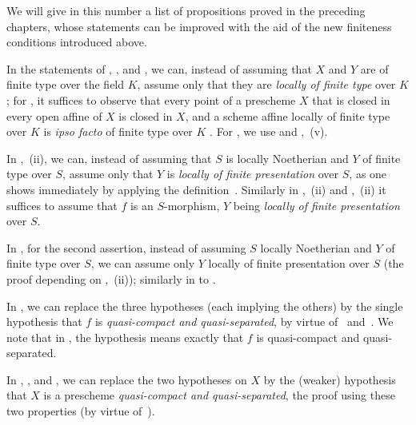 We will give in this number a list of propositions proved in the preceding chapters, whose statements can be improved with the aid of the new finiteness conditions introduced above.

\begin{env}[1.7.1]
\label{IV.1.7.1}
In the statements of , , and , we can, instead of assuming that $X$ and $Y$ are of finite type over the field $K$, assume only that they are \emph{locally of finite type} over $K$; for , it suffices to observe that every point of a prescheme $X$ that is closed in every open affine of $X$ is closed in $X$, and a scheme affine locally of finite type over $K$ is \emph{ipso facto} of finite type over $K$ .
For , we use  and ,~(v).
\end{env}

\begin{env}[1.7.2]
\label{IV.1.7.2}
In ,~(ii), we can, instead of assuming that $S$ is locally Noetherian and $Y$ of finite type over $S$, assume only that $Y$ is \emph{locally of finite presentation} over $S$, as one shows immediately by applying the definition~.
Similarly in ,~(ii) and ,~(ii) it suffices to assume that $f$ is an $S$-morphism, $Y$ being \emph{locally of finite presentation} over $S$.
\end{env}

\begin{env}[1.7.3]
\label{IV.1.7.3}
In , for the second assertion, instead of assuming $S$ locally Noetherian and $Y$ of finite type over $S$, we can assume only $Y$ locally of finite presentation over $S$ (the proof depending on ,~(ii)); similarly in  to .
\end{env}

\begin{env}[1.7.4]
\label{IV.1.7.4}
In , we can replace the three hypotheses (each implying the others) by the single hypothesis that $f$ is \emph{quasi-compact and quasi-separated}, by virtue of~ and~.
We note that in , the hypothesis means exactly that $f$ is quasi-compact and quasi-separated.
\end{env}

\begin{env}[1.7.5]
\label{IV.1.7.5}
In , , and , we can replace the two hypotheses on $X$ by the (weaker) hypothesis that $X$ is a prescheme \emph{quasi-compact and quasi-separated}, the proof using these two properties (by virtue of~).
\end{env}

